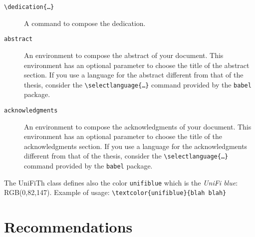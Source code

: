 \documentclass[a5paper,11pt]{article}
\newcommand{\bs}{\textbackslash}
\begin{document}
\begin{description}

\item[\texttt{\bs dedication\{\dots\}}] A command to compose the dedication.

\item[\texttt{abstract}] An environment to compose the abstract of your document. This environment has an optional parameter to choose the title of the abstract section.
If you use a language for the abstract different from that of the thesis, consider the \texttt{\bs selectlanguage\{\dots\}} command provided by the \texttt{babel} package.

\item[\texttt{acknowledgments}] An environment to compose the acknowledgments of your document. This environment has an optional parameter to choose the title of the acknowledgments section.
If you use a language for the acknowledgments different from that of the thesis, consider the \texttt{\bs selectlanguage\{\dots\}} command provided by the \texttt{babel} package.


\end{description}

The \textsf{UniFiTh} class defines also the color \texttt{unifiblue} which is the \emph{UniFi blue}: RGB(0,82,147).
Example of usage: \texttt{\bs textcolor\{unifiblue\}\{blah blah\}}


\section{Recommendations}
\end{document}
